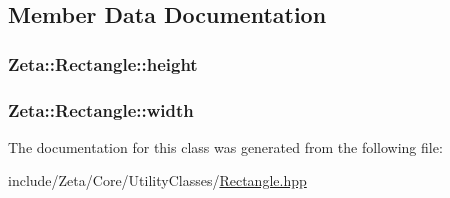 \subsection{Member Data Documentation}
\hypertarget{classZeta_1_1Rectangle_a640f13febc3856b9c4a0729a3aeec1a8}{
\subsubsection[{height}]{ Zeta\+::\+Rectangle\+::height\hspace{0.3cm}{\ttfamily [protected]}}}\label{classZeta_1_1Rectangle_a640f13febc3856b9c4a0729a3aeec1a8}
\hypertarget{classZeta_1_1Rectangle_a1d564c934b684c156de3fe425ac42e74}{
\subsubsection[{width}]{ Zeta\+::\+Rectangle\+::width\hspace{0.3cm}{\ttfamily [protected]}}}\label{classZeta_1_1Rectangle_a1d564c934b684c156de3fe425ac42e74}


The documentation for this class was generated from the following file\+:\begin{DoxyCompactItemize}
\item 
include/\+Zeta/\+Core/\+Utility\+Classes/\hyperlink{Rectangle_8hpp}{Rectangle.\+hpp}\end{DoxyCompactItemize}
